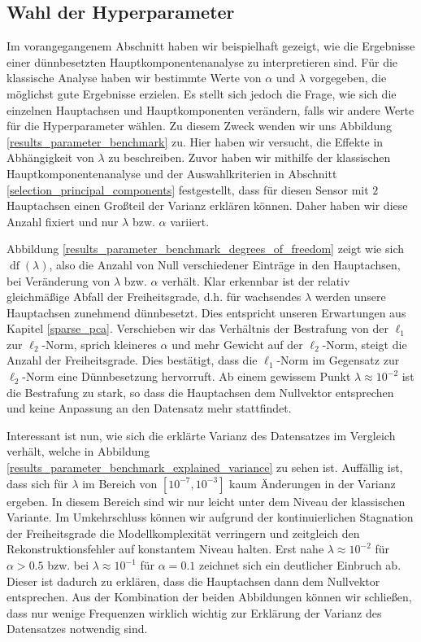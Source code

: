 \subsection{Wahl der Hyperparameter}

Im vorangegangenem Abschnitt haben wir beispielhaft gezeigt, wie die Ergebnisse einer dünnbesetzten Hauptkomponentenanalyse zu interpretieren sind. Für die klassische Analyse haben wir bestimmte Werte von $\alpha$ und $\lambda$ vorgegeben, die möglichst gute Ergebnisse erzielen. Es stellt sich jedoch die Frage, wie sich die einzelnen Hauptachsen und Hauptkomponenten verändern, falls wir andere Werte für die Hyperparameter wählen. Zu diesem Zweck wenden wir uns Abbildung \ref{results_parameter_benchmark} zu. Hier haben wir versucht, die Effekte in Abhängigkeit von $\lambda$ zu beschreiben. Zuvor haben wir mithilfe der klassischen Hauptkomponentenanalyse und der Auswahlkriterien in Abschnitt \ref{selection_principal_components} festgestellt, dass für diesen Sensor mit $2$ Hauptachsen einen Großteil der Varianz erklären können. Daher haben wir diese Anzahl fixiert und nur $\lambda$ bzw. $\alpha$ variiert. 

Abbildung \ref{results_parameter_benchmark_degrees_of_freedom} zeigt wie sich $\operatorname{df}(\lambda)$, also die Anzahl von Null verschiedener Einträge in den Hauptachsen, bei Veränderung von $\lambda$ bzw. $\alpha$ verhält. Klar erkennbar ist der relativ gleichmäßige Abfall der Freiheitsgrade, d.h. für wachsendes $\lambda$ werden unsere Hauptachsen zunehmend dünnbesetzt. Dies entspricht unseren Erwartungen aus Kapitel \ref{sparse_pca}. Verschieben wir das Verhältnis der Bestrafung von der $\ell_1$ zur $\ell_2$-Norm, sprich kleineres $\alpha$ und mehr Gewicht auf der $\ell_2$-Norm, steigt die Anzahl der Freiheitsgrade. Dies bestätigt, dass die $\ell_1$-Norm im Gegensatz zur $\ell_2$-Norm eine Dünnbesetzung hervorruft. Ab einem gewissem Punkt $\lambda \approx 10^{-2}$ ist die Bestrafung zu stark, so dass die Hauptachsen dem Nullvektor entsprechen und keine Anpassung an den Datensatz mehr stattfindet.

Interessant ist nun, wie sich die erklärte Varianz des Datensatzes im Vergleich verhält, welche in Abbildung \ref{results_parameter_benchmark_explained_variance} zu sehen ist.  Auffällig ist, dass sich für $\lambda$ im Bereich von $[10^{-7}, 10^{-3}]$ kaum Änderungen in der Varianz ergeben. In diesem Bereich sind wir nur leicht unter dem Niveau der klassischen Variante. Im Umkehrschluss können wir aufgrund der kontinuierlichen Stagnation der Freiheitsgrade die Modellkomplexität verringern und zeitgleich den Rekonstruktionsfehler auf konstantem Niveau halten. Erst nahe $\lambda \approx 10^{-2}$ für $\alpha > 0.5$ bzw. bei $\lambda \approx 10^{-1}$ für $\alpha = 0.1$ zeichnet sich ein deutlicher Einbruch ab. Dieser ist dadurch zu erklären, dass die Hauptachsen dann dem Nullvektor entsprechen. Aus der Kombination der beiden Abbildungen können wir schließen, dass nur wenige Frequenzen wirklich wichtig zur Erklärung der Varianz des Datensatzes notwendig sind.

